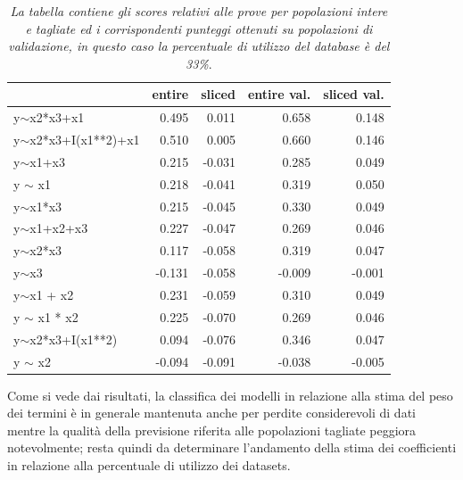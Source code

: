 \documentclass[a4paper]{report}
\begin{document}
\begin{table}[h!btp]
\begin{tabular}{lrrrr}
\toprule
{} &  entire &  sliced &  entire val. &  sliced val. \\
\midrule
y$\sim$x2*x3+x1          &         0.495 &         0.011 &             0.658 &             0.148 \\
y$\sim$x2*x3+I(x1**2)+x1 &         0.510 &         0.005 &             0.660 &             0.146 \\
y$\sim$x1+x3             &         0.215 &        -0.031 &             0.285 &             0.049 \\
y $\sim$ x1              &         0.218 &        -0.041 &             0.319 &             0.050 \\
y$\sim$x1*x3             &         0.215 &        -0.045 &             0.330 &             0.049 \\
y$\sim$x1+x2+x3          &         0.227 &        -0.047 &             0.269 &             0.046 \\
y$\sim$x2*x3             &         0.117 &        -0.058 &             0.319 &             0.047 \\
y$\sim$x3                &        -0.131 &        -0.058 &            -0.009 &            -0.001 \\
y$\sim$x1 + x2           &         0.231 &        -0.059 &             0.310 &             0.049 \\
y $\sim$ x1 * x2         &         0.225 &        -0.070 &             0.269 &             0.046 \\
y$\sim$x2*x3+I(x1**2)    &         0.094 &        -0.076 &             0.346 &             0.047 \\
y $\sim$ x2              &        -0.094 &        -0.091 &            -0.038 &            -0.005 \\
\bottomrule
\end{tabular}
\caption{\textit{La tabella contiene gli scores relativi alle prove per popolazioni intere e tagliate ed i corrispondenti punteggi  ottenuti su popolazioni di validazione, in questo caso la percentuale di utilizzo del database è del 33\%}.}
\end{table}
Come si vede dai risultati, la classifica dei modelli in relazione alla stima del peso dei termini è in generale mantenuta anche per perdite considerevoli di dati mentre la qualità della previsione riferita alle popolazioni tagliate peggiora notevolmente; resta quindi da determinare l'andamento della stima dei coefficienti in relazione alla percentuale di utilizzo dei datasets.
\end{document}
